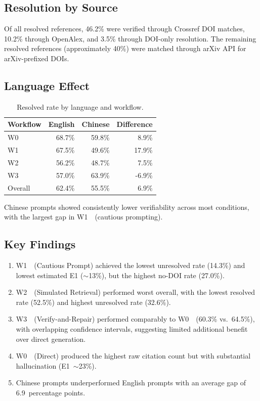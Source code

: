\documentclass[11pt,a4paper]{article}
\newcommand{\wzero}{W0~}
\newcommand{\wone}{W1~}
\newcommand{\wtwo}{W2~}
\newcommand{\wthree}{W3~}
\begin{document}
\subsection{Resolution by Source}

Of all resolved references, 46.2\% were verified through Crossref DOI matches, 10.2\% through OpenAlex, and 3.5\% through DOI-only resolution. The remaining resolved references (approximately 40\%) were matched through arXiv API for arXiv-prefixed DOIs.

\subsection{Language Effect}

\begin{table}[ht]
\centering
\begin{tabular}{lrrr}
\toprule
\textbf{Workflow} & \textbf{English} & \textbf{Chinese} & \textbf{Difference} \\
\midrule
\wzero & 68.7\% & 59.8\% & 8.9\% \\
\wone  & 67.5\% & 49.6\% & 17.9\% \\
\wtwo  & 56.2\% & 48.7\% & 7.5\% \\
\wthree & 57.0\% & 63.9\% & -6.9\% \\
\midrule
Overall & 62.4\% & 55.5\% & 6.9\% \\
\bottomrule
\end{tabular}
\caption{Resolved rate by language and workflow.}
\label{tab:language}
\end{table}

Chinese prompts showed consistently lower verifiability across most conditions, with the largest gap in \wone~(cautious prompting).

\subsection{Key Findings}

\begin{enumerate}[nosep]
    \item \wone~(Cautious Prompt) achieved the lowest unresolved rate (14.3\%) and lowest estimated E1 ($\sim$13\%), but the highest no-DOI rate (27.0\%).
    \item \wtwo~(Simulated Retrieval) performed worst overall, with the lowest resolved rate (52.5\%) and highest unresolved rate (32.6\%).
    \item \wthree~(Verify-and-Repair) performed comparably to \wzero~(60.3\% vs.~64.5\%), with overlapping confidence intervals, suggesting limited additional benefit over direct generation.
    \item \wzero~(Direct) produced the highest raw citation count but with substantial hallucination (E1~$\sim$23\%).
    \item Chinese prompts underperformed English prompts with an average gap of 6.9~percentage points.
\end{enumerate}
\end{document}

